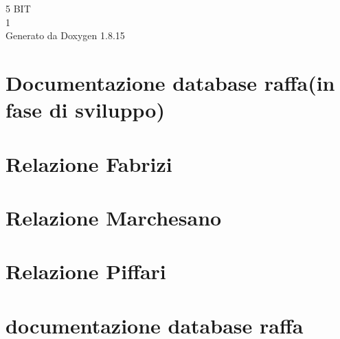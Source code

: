 \let\mypdfximage\pdfximage\def\pdfximage{\immediate\mypdfximage}\documentclass[twoside]{book}
\newcommand{\+}{\discretionary{\mbox{\scriptsize$\hookleftarrow$}}{}{}}
\newcommand{\clearemptydoublepage}{%
  \newpage{\pagestyle{empty}\cleardoublepage}%
}
\begin{document}
\hypersetup{pageanchor=false,
             bookmarksnumbered=true,
             pdfencoding=unicode
            }
\begin{titlepage}
\vspace*{7cm}
\begin{center}%
{\Large 5 B\+IT \\[1ex]\large 1 }\\
\vspace*{1cm}
{\large Generato da Doxygen 1.8.15}\\
\end{center}
\end{titlepage}
\clearemptydoublepage
{}
\tableofcontents
\clearemptydoublepage
{}
\hypersetup{pageanchor=true}

\chapter{Documentazione database raffa(in fase di sviluppo)}
\label{md_documenti_documentazione_documentazione_database}

\chapter{Relazione Fabrizi}
\label{md_documenti_documentazione_relazione_fabrizi}

\chapter{Relazione Marchesano}
\label{md_documenti_documentazione_relazione_marchesano}

\chapter{Relazione Piffari}
\label{md_documenti_documentazione_relazione_piffari}

\chapter{documentazione database raffa}
\label{md_documenti_documentazione_database}

\end{document}
